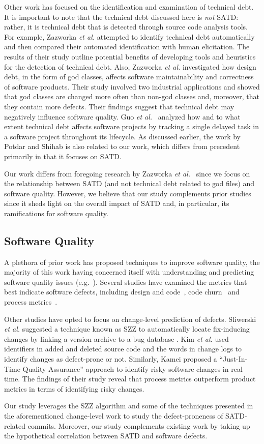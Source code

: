 Other work has focused on the identification and examination of technical debt. It is important to note that the technical debt discussed here is \emph{not} SATD: rather, it is technical debt that is detected through source code analysis tools. For example,  Zazworka {\em et al.} \cite{Zazworka:2013} attempted to identify technical debt automatically and then compared their automated identification with human elicitation. The results of their study outline potential benefits of developing tools and heuristics for the detection of technical debt. Also, Zazworka {\em et al.} \cite{zazworka2011investigating} investigated how design debt, in the form of god classes, affects software maintainability and correctness of software products. Their study involved two industrial applications and showed that god classes are changed more often than non-god classes and, moreover, that they contain more defects. Their findings suggest that technical debt may negatively influence software quality. Guo {\em et al.}~\cite{GuoSGCTSSS11} analyzed how and to what extent technical debt affects software projects by tracking a single delayed task in a software project throughout its lifecycle. As discussed earlier, the work by Potdar and Shihab \cite{ICSM_PotdarS14} is also related to our work, which differs from precedent primarily in that it focuses on SATD.

Our work differs from foregoing research by Zazworka {\em et al.}~\cite{zazworka2011investigating,Zazworka:2013} since we focus on the relationship between SATD (and not technical debt related to god files) and software quality. However, we believe that our study complements prior studies since it sheds light on the overall impact of SATD and, in particular, its ramifications for software quality.

\subsection{Software Quality}

A plethora of prior work has proposed techniques to improve software quality, the majority of this work having concerned itself with understanding and predicting software quality issues (e.g.~\cite{Zimmerman2008Springer}). Several studies have examined the metrics that best indicate software defects, including design and code~\cite{Jiang-promise-2008}, code churn~\cite{Nagappan-icse-2005} and process metrics~\cite{Moser-icse-2008,Rahman-icse-2013}.


Other studies have opted to focus on change-level prediction of defects. Sliwerski  \emph{et al.} suggested a technique known as SZZ to automatically locate fix-inducing changes by linking a version archive to a bug database \cite{Sliwerski-fse-2005}.   Kim \emph{et al.} \cite{Kim-tse-2008} used identifiers in added and deleted source code and the words in change logs to identify changes as defect-prone or not. Similarly,  Kamei \cite{Kamei-tse-2013} proposed a  ``Just-In-Time Quality Assurance''  approach to identify risky software changes in real time.  The findings of their study reveal that process metrics outperform product metrics in terms of identifying risky changes.

Our study leverages the SZZ algorithm and some of the techniques presented in the aforementioned change-level work to study the defect-proneness of SATD-related commits. Moreover, our study complements existing work by taking up the hypothetical correlation between SATD and software defects.
